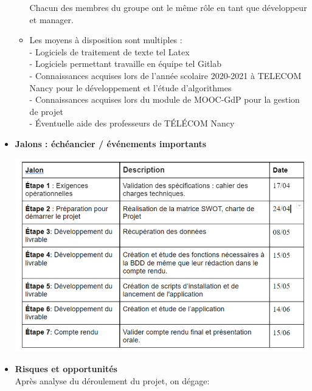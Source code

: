 \begin{itemize}
\begin{itemize}
                    
                    Chacun des membres du groupe ont le même rôle en tant que développeur et manager.\\
                     \item Les moyens à disposition sont multiples :\\
                    - Logiciels de traitement de texte tel Latex\\
                    - Logiciels permettant travaille en équipe tel Gitlab\\
                    - Connaissances acquises lors de l'année scolaire 2020-2021 à TELECOM Nancy pour le développement et l’étude d’algorithmes\\
                    - Connaissances acquises lors du module de MOOC-GdP pour la gestion de projet\\
                    - Éventuelle aide des professeurs de TÉLÉCOM Nancy\\
                \end{itemize}
                \item {\textbf {Jalons : échéancier / événements importants}}\\
                
                 \begin{center}
         \includegraphics[width=15cm]{jalons.png}\\

         \end{center}

                \item {\textbf {Risques et opportunités}}\\
                Après analyse du déroulement du projet, on dégage:\\
                

\end{itemize}
